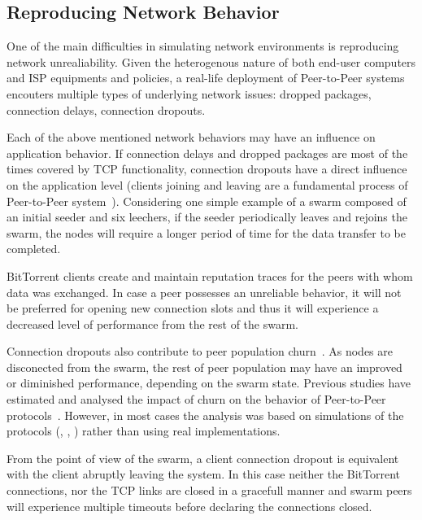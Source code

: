 \subsection{Reproducing Network Behavior}
\label{subsec:virt-infra:behavior}

One of the main difficulties in simulating network environments is reproducing
network unrealiability. Given the heterogenous nature of both end-user
computers and ISP equipments and policies, a real-life deployment of
Peer-to-Peer systems encouters multiple types of underlying network issues:
dropped packages, connection delays, connection dropouts.

Each of the above mentioned network behaviors may have an influence on
application behavior. If connection delays and dropped packages are most of
the times covered by TCP functionality, connection dropouts have a direct
influence on the application level (clients joining and leaving are a
fundamental process of Peer-to-Peer system~\cite{p2p-file-sharing-workload}).
Considering one simple example of a swarm composed of an initial seeder and
six leechers, if the seeder periodically leaves and rejoins the swarm, the
nodes will require a longer period of time for the data transfer to be
completed.

BitTorrent clients create and maintain reputation traces for the peers with
whom data was exchanged. In case a peer possesses an unreliable behavior, it
will not be preferred for opening new connection slots and thus it will
experience a decreased level of performance from the rest of the swarm.

Connection dropouts also contribute to peer population
churn~\cite{understanding-churn}. As nodes are disconected from the swarm, the
rest of peer population may have an improved or diminished performance,
depending on the swarm state. Previous studies have estimated and analysed the
impact of churn on the behavior of Peer-to-Peer
protocols~\cite{Binzenhofer:2007:ECS:1769187.1769257}. However, in most cases
the analysis was based on simulations of the protocols (\cite{Luo2010},
\cite{Katsaros2009}, \cite{Ou:2010:PEK:1749614.1749649}) rather than using
real implementations.

From the point of view of the swarm, a client connection dropout is equivalent
with the client abruptly leaving the system. In this case neither the
BitTorrent connections, nor the TCP links are closed in a gracefull manner and
swarm peers will experience multiple timeouts before declaring the connections
closed.

